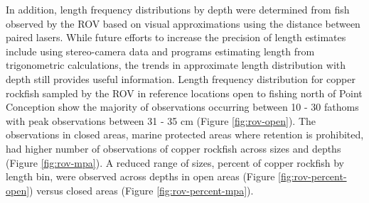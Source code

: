 \documentclass[11pt,
  english,
  a4paper,
]{article}
\begin{document}
\leavevmode\tagmcend\tagstructend\par


In addition, length frequency distributions by depth were determined from fish observed by the ROV based on visual approximations using the distance between paired lasers. While future efforts to increase the precision of length estimates include using stereo-camera data and programs estimating length from trigonometric calculations, the trends in approximate length distribution with depth still provides useful information. Length frequency distribution for copper rockfish sampled by the ROV in reference locations open to fishing north of Point Conception show the majority of observations occurring between 10 - 30 fathoms with peak observations between 31 - 35 cm (Figure \ref{fig:rov-open}). The observations in closed areas, marine protected areas where retention is prohibited, had higher number of observations of copper rockfish across sizes and depths (Figure \ref{fig:rov-mpa}). A reduced range of sizes, percent of copper rockfish by length bin, were observed across depths in open areas (Figure \ref{fig:rov-percent-open}) versus closed areas (Figure \ref{fig:rov-percent-mpa}).

\leavevmode\tagmcend\tagstructend\par

\clearpage

\begingroup\fontsize{10}{12}\selectfont
\begingroup\fontsize{10}{12}\selectfont
\end{document}
